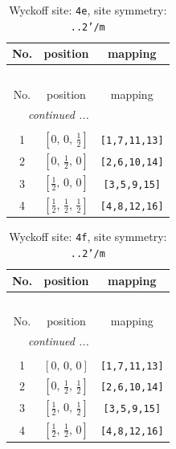 \documentclass[fleqn,8pt]{jsarticle}
\begin{document}
\renewcommand{\arraystretch}{1.2}
\begin{longtable}{ccc}
\caption{Wyckoff site: {\tt 4e}, site symmetry: {\tt ..2'/m}}
 \\
 \hline \hline
No. & position & mapping \\ \hline \endfirsthead

\multicolumn{2}{l}{\tablename\ \thetable{}} \\
 \hline \hline
No. & position & mapping \\ \hline \endhead

 \hline \hline
\multicolumn{2}{r}{\footnotesize\it continued ...} \\ \endfoot

 \hline \hline
\multicolumn{2}{r}{} \\ \endlastfoot

1 & $\left[ 0,\, 0,\, \frac{1}{2} \right]$ & {\tt [1,7,11,13]} \\ \hline
2 & $\left[ 0,\, \frac{1}{2},\, 0 \right]$ & {\tt [2,6,10,14]} \\ \hline
3 & $\left[ \frac{1}{2},\, 0,\, 0 \right]$ & {\tt [3,5,9,15]} \\ \hline
4 & $\left[ \frac{1}{2},\, \frac{1}{2},\, \frac{1}{2} \right]$ & {\tt [4,8,12,16]} \\
\end{longtable}
\renewcommand{\arraystretch}{1.2}
\begin{longtable}{ccc}
\caption{Wyckoff site: {\tt 4f}, site symmetry: {\tt ..2'/m}}
 \\
 \hline \hline
No. & position & mapping \\ \hline \endfirsthead

\multicolumn{2}{l}{\tablename\ \thetable{}} \\
 \hline \hline
No. & position & mapping \\ \hline \endhead

 \hline \hline
\multicolumn{2}{r}{\footnotesize\it continued ...} \\ \endfoot

 \hline \hline
\multicolumn{2}{r}{} \\ \endlastfoot

1 & $\left[ 0,\, 0,\, 0 \right]$ & {\tt [1,7,11,13]} \\ \hline
2 & $\left[ 0,\, \frac{1}{2},\, \frac{1}{2} \right]$ & {\tt [2,6,10,14]} \\ \hline
3 & $\left[ \frac{1}{2},\, 0,\, \frac{1}{2} \right]$ & {\tt [3,5,9,15]} \\ \hline
4 & $\left[ \frac{1}{2},\, \frac{1}{2},\, 0 \right]$ & {\tt [4,8,12,16]} \\
\end{longtable}
\end{document}

